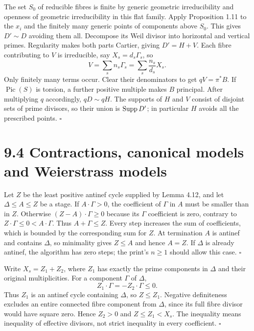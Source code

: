 \documentclass[11pt]{article}
\let\chapterexercise\exercise
\renewcommand{\exercise}[2]{\Needspace{8\baselineskip}\chapterexercise{#1}{#2}}
\begin{document}
\pf The set $S_0$ of reducible fibres is finite by generic geometric irreducibility and openness of geometric irreducibility in this flat family. Apply Proposition 1.11 to the $x_i$ and the finitely many generic points of components above $S_0$. This gives $D'\sim D$ avoiding them all. Decompose its Weil divisor into horizontal and vertical primes. Regularity makes both parts Cartier, giving $D'=H+V$. Each fibre contributing to $V$ is irreducible, say $X_s=d_s\Gamma_s$, so
\[ V=\sum_s n_s\Gamma_s=\sum_s\frac{n_s}{d_s}X_s. \]
Only finitely many terms occur. Clear their denominators to get $qV=\pi^*B$. If $\operatorname{Pic}(S)$ is torsion, a further positive multiple makes $B$ principal. After multiplying $q$ accordingly, $qD\sim qH$. The supports of $H$ and $V$ consist of disjoint sets of prime divisors, so their union is $\operatorname{Supp} D'$; in particular $H$ avoids all the prescribed points. \hfill$\square$

\section*{9.4 Contractions, canonical models and Weierstrass models}

\pf Let $Z$ be the least positive antinef cycle supplied by Lemma 4.12, and let $\Delta\le A\le Z$ be a stage. If $A\cdot\Gamma>0$, the coefficient of $\Gamma$ in $A$ must be smaller than in $Z$. Otherwise $(Z-A)\cdot\Gamma\ge0$ because its $\Gamma$ coefficient is zero, contrary to $Z\cdot\Gamma\le0<A\cdot\Gamma$. Thus $A+\Gamma\le Z$. Every step increases the sum of coefficients, which is bounded by the corresponding sum for $Z$. At termination $A$ is antinef and contains $\Delta$, so minimality gives $Z\le A$ and hence $A=Z$. If $\Delta$ is already antinef, the algorithm has zero steps; the print's $n\ge1$ should allow this case. \hfill$\square$

\pf Write $X_s=Z_1+Z_2$, where $Z_1$ has exactly the prime components in $\Delta$ and their original multiplicities. For a component $\Gamma$ of $\Delta$,
\[ Z_1\cdot\Gamma=-Z_2\cdot\Gamma\le0. \]
Thus $Z_1$ is an antinef cycle containing $\Delta$, so $Z\le Z_1$. Negative definiteness excludes an entire connected fibre component from $\Delta$, since its full fibre divisor would have square zero. Hence $Z_2>0$ and $Z\le Z_1<X_s$. The inequality means inequality of effective divisors, not strict inequality in every coefficient. \hfill$\square$
\end{document}
